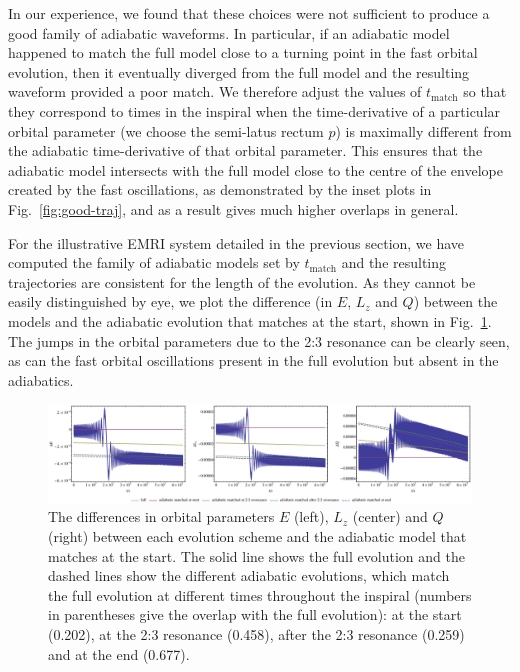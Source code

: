 \documentclass[aps,prd,amsfonts,amssymb,amsmath,nofootinbib,reprint,showpacs,superscriptaddress,twocolumn]{revtex4}
\newcommand{\figref}[1]{Fig.\ \ref{fig:#1}}
\begin{document}
In our experience, we found that these choices were not sufficient to produce a good family of adiabatic waveforms. In particular, if an adiabatic model happened to match the full model close to a turning point in the fast orbital evolution, then it eventually diverged from the full model and the resulting waveform provided a poor match. We therefore adjust the values of $t_{\mathrm{match}}$ so that they correspond to times in the inspiral when the time-derivative of a particular orbital parameter (we choose the semi-latus rectum $p$) is maximally different from the adiabatic time-derivative of that orbital parameter. This ensures that the adiabatic model intersects with the full model close to the centre of the envelope created by the fast oscillations, as demonstrated by the inset plots in \figref{good-traj}, and as a result gives much higher overlaps in general.

For the illustrative EMRI system detailed in the previous section, we have computed the family of adiabatic models set by $t_{\mathrm{match}}$ and the resulting trajectories are consistent for the length of the evolution. As they cannot be easily distinguished by eye, we plot the difference (in $E$, $L_z$ and $Q$) between the models and the adiabatic evolution that matches at the start, shown in \figref{res-diff-traj}. The jumps in the orbital parameters due to the 2:3 resonance can be clearly seen, as can the fast orbital oscillations present in the full evolution but absent in the adiabatics.

\begin{figure}[htbp]
\centering
\includegraphics[width=\textwidth]{Fig_res_diff_traj}
\caption{\label{fig:res-diff-traj}The differences in orbital parameters $E$ (left), $L_z$ (center) and $Q$ (right) between each evolution scheme and the adiabatic model that matches at the start. The solid line shows the full evolution and the dashed lines show the different adiabatic evolutions, which match the full evolution at different times throughout the inspiral (numbers in parentheses give the overlap with the full evolution): at the start (0.202), at the 2:3 resonance (0.458), after the 2:3 resonance (0.259) and at the end (0.677).}
\end{figure}
\end{document}
